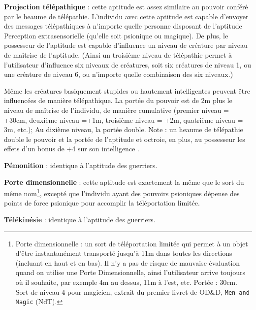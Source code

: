 \documentclass[11pt]{article}
\begin{document}
{\textbf{Projection télépathique} : cette aptitude est assez similaire au pouvoir conféré par le heaume de télépathie. L'individu avec cette aptitude est capable d'envoyer des messages télépathiques à n'importe quelle personne  disposant de l'aptitude Perception extrasensorielle (qu'elle soit psionique ou magique). De plus, le possesseur de l'aptitude est capable d'influence un niveau de créature par niveau de maîtrise de l'aptitude. (Ainsi un troisième niveau de télépathie permet à l'utilisateur d'influence six niveaux de créatures, soit six créatures de niveau 1, ou une créature de niveau 6, ou n'importe quelle combinaison des six niveaux.)

\bigskip

Même les créatures basiquement stupides ou hautement intelligentes peuvent être influencées de manière télépathique. La portée du pouvoir est de 2m plus le niveau de maîtrise de l'individu, de manière cumulative (premier niveau = +30cm, deuxième niveau =+1m, troisième niveau = +2m, quatrième niveau = 3m, etc.); Au dixième niveau, la portée double. Note : un heaume de télépathie double le pouvoir et la portée de l'aptitude et octroie, en plus, au possesseur les effets d'un bonus de +4 sur son intelligence .

\bigskip

\textbf{Pémonition} : identique à l'aptitude des guerriers.

\bigskip

\textbf{Porte dimensionnelle} : cette aptitude est exactement la même que le sort du même nom\footnote{
\og Porte dimensionnelle : un sort de téléportation limitée qui permet à un objet d'être instantanément transporté jusqu'à 11m dans toutes les directions (incluant en haut et en bas). Il n'y a pas de risque de mauvaise évaluation quand on utilise une Porte Dimensionnelle, ainsi l'utilisateur arrive toujours où il souhaite, par exemple 4m au dessus, 11m à l'est, etc. Portée : 30cm. \fg{} Sort de niveau 4 pour magicien, extrait du premier livret de OD\&D, \texttt{Men and Magic} (NdT).
}, excepté que l'individu ayant des pouvoirs psioniques dépense des points de force psionique pour accomplir la téléportation limitée.

\bigskip

\textbf{Télékinésie} : identique à l'aptitude des guerriers.

\bigskip

}
\end{document}
